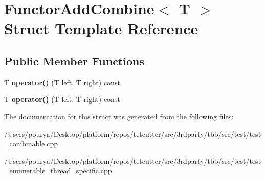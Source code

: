 \hypertarget{structFunctorAddCombine}{}\section{Functor\+Add\+Combine$<$ T $>$ Struct Template Reference}
\label{structFunctorAddCombine}
\subsection*{Public Member Functions}
\begin{DoxyCompactItemize}
\item 
\hypertarget{structFunctorAddCombine_aed384228014eb9d3c4064ef6c7ac906a}{}T {\bfseries operator()} (T left, T right) const \label{structFunctorAddCombine_aed384228014eb9d3c4064ef6c7ac906a}

\item 
\hypertarget{structFunctorAddCombine_aed384228014eb9d3c4064ef6c7ac906a}{}T {\bfseries operator()} (T left, T right) const \label{structFunctorAddCombine_aed384228014eb9d3c4064ef6c7ac906a}

\end{DoxyCompactItemize}


The documentation for this struct was generated from the following files\+:\begin{DoxyCompactItemize}
\item 
/\+Users/pourya/\+Desktop/platform/repos/tetcutter/src/3rdparty/tbb/src/test/test\+\_\+combinable.\+cpp\item 
/\+Users/pourya/\+Desktop/platform/repos/tetcutter/src/3rdparty/tbb/src/test/test\+\_\+enumerable\+\_\+thread\+\_\+specific.\+cpp\end{DoxyCompactItemize}
